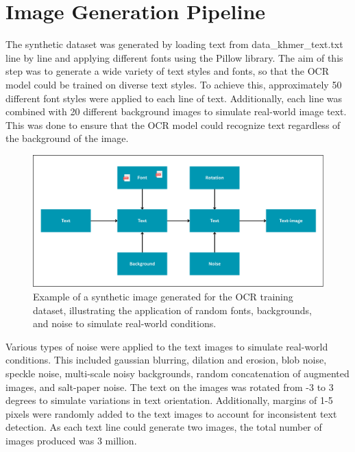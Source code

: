 \section{Image Generation Pipeline}
\label{sec:generation}
The synthetic dataset was generated by loading text from data\_khmer\_text.txt line 
by line and applying different fonts using the Pillow library. The aim of this 
step was to generate a wide variety of text styles and fonts, so that the OCR 
model could be trained on diverse text styles. To achieve this, approximately 
50 different font styles were applied to each line of text. Additionally, 
each line was combined with 20 different background images to simulate real-world 
image text. This was done to ensure that the OCR model could recognize text 
regardless of the background of the image.

\begin{figure}[ht]
    \centering
    \includegraphics[width=\textwidth]{figures/synthetic_image.png}
    \caption{Example of a synthetic image generated for the OCR training dataset, 
    illustrating the application of random fonts, backgrounds, and noise to simulate 
    real-world conditions.}
    \label{fig:synthetic-image}
\end{figure}


Various types of noise were applied to the text images to simulate real-world 
conditions. This included gaussian blurring, dilation and erosion, blob noise, 
speckle noise, multi-scale noisy backgrounds, random concatenation of augmented 
images, and salt-paper noise. The text on the images was rotated from -3 to 3 
degrees to simulate variations in text orientation. Additionally, margins of 
1-5 pixels were randomly added to the text images to account for inconsistent 
text detection. As each text line could generate two images, the total number 
of images produced was 3 million.



